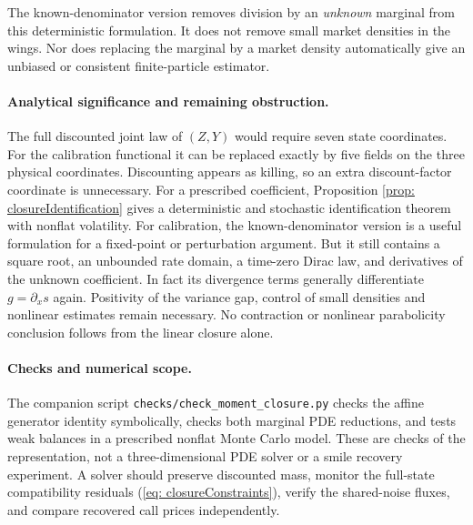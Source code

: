 The known-denominator version removes division by an \emph{unknown} marginal
from this deterministic formulation. It does not remove small market densities
in the wings. Nor does replacing the marginal by a market density automatically
give an unbiased or consistent finite-particle estimator.

\paragraph{Analytical significance and remaining obstruction.}
The full discounted joint law of $(Z,Y)$ would require seven state coordinates.
For the calibration functional it can be replaced exactly by five fields on
the three physical coordinates. Discounting appears as killing, so an extra
discount-factor coordinate is unnecessary. For a prescribed coefficient,
Proposition \ref{prop: closureIdentification} gives a deterministic and
stochastic identification theorem with nonflat volatility.
For calibration, the known-denominator version is a useful formulation for
a fixed-point or perturbation argument. But it still contains a square root,
an unbounded rate domain, a time-zero Dirac law, and derivatives of the unknown
coefficient. In fact its divergence terms generally differentiate
$g=\partial_xs$ again. Positivity of the variance gap, control of small
densities and nonlinear estimates remain necessary. No contraction or
nonlinear parabolicity conclusion follows from the linear closure alone.

\paragraph{Checks and numerical scope.}
The companion script \texttt{checks/check\_moment\_closure.py} checks the
affine generator identity symbolically, checks both marginal PDE reductions,
and tests weak balances in a prescribed nonflat Monte Carlo model. These are
checks of the representation, not a three-dimensional PDE solver or a smile
recovery experiment. A solver should preserve discounted mass, monitor the
full-state compatibility residuals (\ref{eq: closureConstraints}), verify
the shared-noise fluxes, and compare recovered call prices independently.
